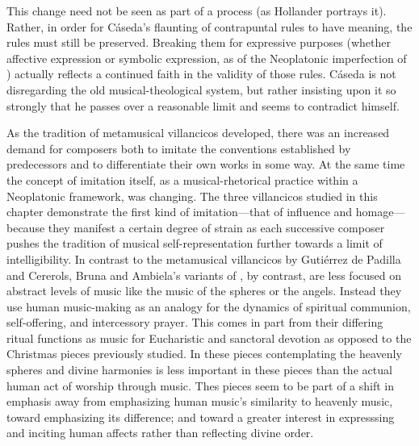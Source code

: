 This change need not be seen as part of a  process (as
Hollander portrays it).
Rather, in order for Cáseda's flaunting of contrapuntal rules to have meaning,
the rules must still be preserved.
Breaking them for expressive purposes (whether affective expression or symbolic
expression, as of the Neoplatonic imperfection of ) actually reflects a continued faith in the validity of those
rules.
Cáseda is not disregarding the old musical-theological system, but rather
insisting upon it so strongly that he passes over a reasonable limit and seems
to contradict himself.

As the tradition of metamusical villancicos developed, there was an increased
demand for composers both to imitate the conventions established by
predecessors and to differentiate their own works in some way. 
At the same time the concept of imitation itself, as a musical-rhetorical
practice within a Neoplatonic framework, was changing.
The three villancicos studied in this chapter demonstrate the first kind of
imitation---that of influence and homage---because they manifest a certain
degree of strain as each successive composer pushes the tradition of musical
self-representation further towards a limit of intelligibility.
In contrast to the metamusical villancicos by Gutiérrez de Padilla and
Cererols, Bruna and Ambiela's variants of , by
contrast, are less focused on abstract levels of music like the music of the
spheres or the angels.
Instead they use human music-making as an analogy for the dynamics of spiritual
communion, self-offering, and intercessory prayer.
This comes in part from their differing ritual functions as music for
Eucharistic and sanctoral devotion as opposed to the Christmas pieces
previously studied.
In these pieces contemplating the heavenly spheres and divine harmonies is less
important in these pieces than the actual human act of worship through music.
Thes pieces seem to be part of a shift in emphasis away from emphasizing human
music's similarity to heavenly music, toward emphasizing its difference; and
toward a greater interest in expresssing and inciting human affects rather than
reflecting divine order.

